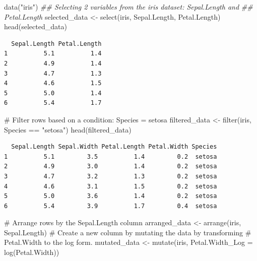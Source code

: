 \documentclass[
  letterpaper,
  DIV=11,
  numbers=noendperiod]{scrreprt}
\newenvironment{Shaded}{\begin{snugshade}}{\end{snugshade}}
\newcommand{\AttributeTok}[1]{\textcolor[rgb]{0.40,0.45,0.13}{#1}}
\newcommand{\CommentTok}[1]{\textcolor[rgb]{0.37,0.37,0.37}{#1}}
\newcommand{\DocumentationTok}[1]{\textcolor[rgb]{0.37,0.37,0.37}{\textit{#1}}}
\newcommand{\FunctionTok}[1]{\textcolor[rgb]{0.28,0.35,0.67}{#1}}
\newcommand{\NormalTok}[1]{\textcolor[rgb]{0.00,0.23,0.31}{#1}}
\newcommand{\OtherTok}[1]{\textcolor[rgb]{0.00,0.23,0.31}{#1}}
\newcommand{\SpecialCharTok}[1]{\textcolor[rgb]{0.37,0.37,0.37}{#1}}
\newcommand{\StringTok}[1]{\textcolor[rgb]{0.13,0.47,0.30}{#1}}
\begin{document}
\begin{Shaded}
\begin{Highlighting}[]
\FunctionTok{data}\NormalTok{(}\StringTok{"iris"}\NormalTok{)}
\DocumentationTok{\#\# Selecting 2 variables from the iris dataset: Sepal.Length and}
\DocumentationTok{\#\# Petal.Length}
\NormalTok{selected\_data }\OtherTok{\textless{}{-}} \FunctionTok{select}\NormalTok{(iris, Sepal.Length, Petal.Length)}
\FunctionTok{head}\NormalTok{(selected\_data)}
\end{Highlighting}
\end{Shaded}

\begin{verbatim}
  Sepal.Length Petal.Length
1          5.1          1.4
2          4.9          1.4
3          4.7          1.3
4          4.6          1.5
5          5.0          1.4
6          5.4          1.7
\end{verbatim}

\begin{Shaded}
\begin{Highlighting}[]
\CommentTok{\# Filter rows based on a condition: Species = setosa}
\NormalTok{filtered\_data }\OtherTok{\textless{}{-}} \FunctionTok{filter}\NormalTok{(iris, Species }\SpecialCharTok{==} \StringTok{"setosa"}\NormalTok{)}
\FunctionTok{head}\NormalTok{(filtered\_data)}
\end{Highlighting}
\end{Shaded}

\begin{verbatim}
  Sepal.Length Sepal.Width Petal.Length Petal.Width Species
1          5.1         3.5          1.4         0.2  setosa
2          4.9         3.0          1.4         0.2  setosa
3          4.7         3.2          1.3         0.2  setosa
4          4.6         3.1          1.5         0.2  setosa
5          5.0         3.6          1.4         0.2  setosa
6          5.4         3.9          1.7         0.4  setosa
\end{verbatim}

\begin{Shaded}
\begin{Highlighting}[]
\CommentTok{\# Arrange rows by the Sepal.Length column}
\NormalTok{arranged\_data }\OtherTok{\textless{}{-}} \FunctionTok{arrange}\NormalTok{(iris, Sepal.Length)}
\CommentTok{\# Create a new column by mutating the data by transforming}
\CommentTok{\# Petal.Width to the log form.}
\NormalTok{mutated\_data }\OtherTok{\textless{}{-}} \FunctionTok{mutate}\NormalTok{(iris, }\AttributeTok{Petal.Width\_Log =} \FunctionTok{log}\NormalTok{(Petal.Width))}
\end{Highlighting}
\end{Shaded}
\end{document}

